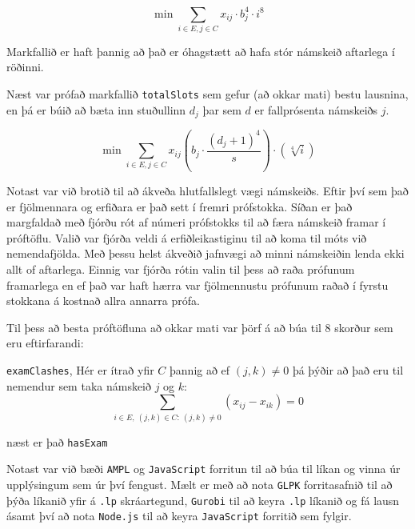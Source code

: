\documentclass[12pt]{article}
\begin{document}
$$\min \sum_{i \in E, j \in C} x_{ij} \cdot b^{4}_j \cdot i^8$$

Markfallið er haft þannig að það er óhagstætt að hafa stór námskeið aftarlega í röðinni.

\medskip
Næst var prófað markfallið \texttt{totalSlots} sem gefur (að okkar mati) bestu lausnina, en þá er búið að bæta inn stuðullinn $ d_{j} $ þar sem $ d $ er fallprósenta námskeiðs $ j $.



$$\min \sum_{i \in E, j \in C} x_{ij} \left(b_j \cdot \dfrac{(d_j + 1)^4}{s} \right) \cdot \left( \sqrt[4]{i} \right)$$

Notast var við brotið til að ákveða hlutfallslegt vægi námskeiðs. Eftir því sem það er fjölmennara og erfiðara er það sett í fremri prófstokka. Síðan er það margfaldað með fjórðu rót af númeri prófstokks til að færa námskeið framar í próftöflu. Valið var fjórða veldi á erfiðleikastiginu til að koma til móts við nemendafjölda. Með þessu helst ákveðið jafnvægi að minni námskeiðin lenda ekki allt of aftarlega. Einnig var fjórða rótin valin til þess að raða prófunum framarlega en ef það var haft hærra var fjölmennustu prófunum raðað í fyrstu stokkana á kostnað allra annarra prófa.

\medskip

Til þess að besta próftöfluna að okkar mati var þörf á að búa til 8 skorður sem eru eftirfarandi:

\texttt{examClashes}, Hér er ítrað yfir $ C $ þannig að ef $ (j,k) \neq 0 $ þá þýðir að það eru til nemendur sem taka námskeið $ j $ og $ k $:
$$\sum_{i \in E, ~(j,k)\in C: ~(j,k) \neq 0} (x_{ij} - x_{ik}) = 0$$

næst er það \texttt{hasExam}

\newpage

Notast var við bæði \texttt{AMPL} og \texttt{JavaScript} forritun til að búa til líkan og vinna úr upplýsingum sem úr því fengust. Mælt er með að nota \texttt{GLPK} forritasafnið til að þýða líkanið yfir á \texttt{.lp} skráartegund, \texttt{Gurobi} til að keyra \texttt{.lp} líkanið og fá lausn ásamt því að nota \texttt{Node.js} til að keyra \texttt{JavaScript} forritið sem fylgir.

\medskip
\end{document}
